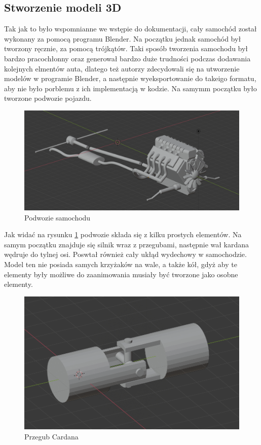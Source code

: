 \documentclass[a4paper,12pt]{article}
\numberwithin{equation}{section}
\begin{document}
\subsection{Stworzenie modeli 3D}

Tak jak to było wspomnianne we wstępie do dokumentacji, cały samochód został wykonany za pomocą programu Blender. Na początku jednak samochód był tworzony ręcznie, za pomocą trójkątów. Taki sposób tworzenia samochodu był bardzo pracochłonny oraz generował bardzo duże trudności podczas dodawania kolejnych elmentów auta, dlatego też autorzy zdecydowali się na utworzenie modelów w programie Blender, a następnie wyeksportowanie do takeigo formatu, aby nie było porblemu z ich implementacją w kodzie. 
Na samymm początku było tworzone podwozie pojazdu.

\begin{figure}[H]
    \centering
    \includegraphics[width=\textwidth]{podwozie.png}
    \caption{Podwozie samochodu}
    \label{fig:podwozie}
\end{figure}

Jak widać na rysunku \ref{fig:podwozie} podwozie składa się z kilku  prostych elementów. Na samym początku znajduje się silnik wraz z przegubami, następnie wał kardana wędruje do tylnej osi. Poswtał również cały ukłąd wydechowy w samochodzie. Model ten nie posiada samych krzyżaków na wale, a także kół, gdyż aby te elementy były możliwe do zaanimowania musiały być tworzone jako osobne elementy. 

\begin{figure}[h!]
    \centering
    \includegraphics[width=\textwidth]{joint.png}
    \caption{Przegub Cardana}
    \label{fig:joint}
\end{figure}
\end{document}
